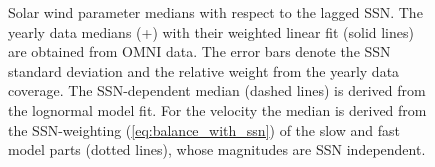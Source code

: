 \documentclass[]{aa}
\begin{document}
	\begin{figure}
		\caption{Solar wind parameter medians with respect to the lagged SSN. The yearly data medians (+) with their weighted linear fit (solid lines) are obtained from OMNI data. The error bars denote the SSN standard deviation and the relative weight from the yearly data coverage. The SSN-dependent median (dashed lines) is derived from the lognormal model fit. For the velocity the median is derived from the SSN-weighting (\ref{eq:balance_with_ssn}) of the slow and fast model parts (dotted lines), whose magnitudes are SSN independent.}
		\label{fig:OMNI_yearly_BVNTvsSSN_a}
	\end{figure}
\end{document}
